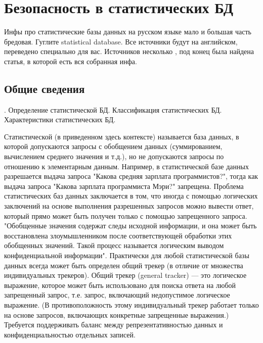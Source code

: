 \section{Безопасность в статистических БД}

Инфы про статистические базы данных на русском языке мало и большая часть бредовая. Гуглите statistical database. Все источники будут на английском, переведено специально для вас. Источников несколько \cite{ComputerSecurity2008} \cite{IntroBD2014}, под конец была найдена статья, \cite{SDB1989} в которой есть вся собранная инфа.

\subsection{Общие сведения}.
Определение статистической БД. Классификация статистических БД. Характеристики статистических БД.

Статистической (в приведенном здесь контексте) называется база данных, в которой допускаются запросы с обобщением данных (суммированием, вычислением среднего значения и т.д.), но не допускаются запросы по отношению к элементарным данным. Например, в статистической базе данных разрешается выдача запроса "Какова средняя зарплата программистов?", тогда как выдача запроса "Какова зарплата программиста Мэри?" запрещена.
Проблема статистических баз данных заключается в том, что иногда с помощью логических заключений на основе выполнения разрешенных запросов можно вывести ответ, который прямо может быть получен только с помощью запрещенного запроса. "Обобщенные значения содержат следы исходной информации, и она может быть восстановлена злоумышленником после соответствующей обработки этих обобщенных значений. Такой процесс называется логическим выводом конфиденциальной информации".
Практически для любой статистической базы данных всегда может быть определен общий трекер (в отличие от множества индивидуальных трекеров). Общий трекер (general tracker) — это логическое выражение, которое может быть использовано для поиска ответа на любой запрещенный запрос, т.е. запрос, включающий недопустимое логическое выражение. (В противоположность этому индивидуальный трекер работает только на основе запросов, включающих конкретные запрещенные выражения.)
Требуется поддерживать баланс между репрезентативностью данных и конфиденциальностью отдельных записей.

